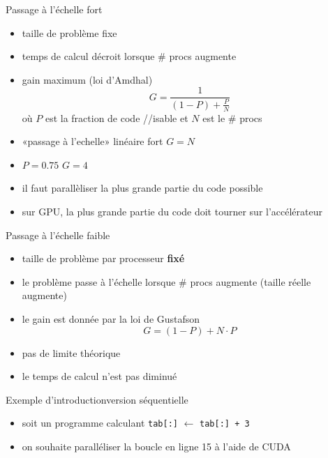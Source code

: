 \documentclass[11pt,mathserif]{beamer}
\newcommand{\scout}{\faAngellist}
\newcommand{\gezi}{\faLongArrowRight}
\newcommand{\galde}{\faQuestion}
\newcommand{\hand}{\faHandORight}
\newcommand{\argi}{\faLightbulbO}
\newcommand{\kontuz}{\faExclamationTriangle}
\newcommand{\triste}{\faFrownO}
\newcommand{\egia}{\faCheckCircle}
\newcommand{\adibi}{\faCommentO}
\newcommand{\geziBikoitz}{\faArrowsH}
\newif\ifC
\newcommand{\mylang}{c}
\newcommand{\extlang}{c}
\newcommand{\mylang}{fortran}
\newcommand{\extlang}{f90}
\newcommand{\includeSrc}[1]{}
\begin{document}
  \lstset{numbers=left}
\begin{frame}{Passage à l'échelle fort}
\begin{itemize}[<+->]
  \item[\egia] taille de problème fixe
  \item[\scout] temps de calcul décroit lorsque \# procs augmente
  \item[\argi] gain maximum (loi d'Amdhal)
\begin{equation*}
G = \frac{1}{(1-P)+ \frac{P}{N}}
\end{equation*}
où $P$ est la fraction de code //isable et $N$ est le \# procs
 \item[\scout] «passage à l'echelle» linéaire fort \geziBikoitz  $G = N$
 \item[\adibi] $P = 0.75$ \gezi $G = 4$ \triste
 \item[\hand] il faut parallèliser la plus grande partie du code possible
 \item[\kontuz] sur GPU, la plus grande partie du code doit tourner sur l'accélérateur
\end{itemize}
\end{frame}

\begin{frame}{Passage à l'échelle faible}
\begin{itemize}[<+->]
  \item[\egia] taille de problème par processeur {\bf fixé}
  \item[\scout] le problème passe à l'échelle lorsque \# procs augmente (taille réelle augmente)
  \item[\argi] le gain est donnée par la loi de Gustafson
\begin{equation*}
G = (1-P) + N\cdot P
\end{equation*}
 \item[\scout] pas de limite théorique
 \item[\kontuz] le temps de calcul n'est pas diminué
\end{itemize}
\end{frame}

\begin{frame}{Exemple d'introduction}{version séquentielle}
\pause
\begin{itemize}[<+->]
  \item[\adibi] soit un programme calculant \texttt{tab[:]} $\leftarrow$ \texttt{tab[:] + 3}
  \includeSrc{code/increment}
   \item[\galde] on souhaite paralléliser la boucle en ligne \ifC 6 \else 15 \fi à l'aide de CUDA
\end{itemize}
\end{frame}
\end{document}
